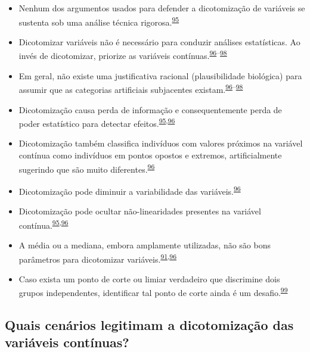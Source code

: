 \documentclass[
  a4paper,
]{book}
\begin{document}
\begin{itemize}
\item
  Nenhum dos argumentos usados para defender a dicotomização de variáveis se sustenta sob uma análise técnica rigorosa.\textsuperscript{\protect\hyperlink{ref-MacCallum2002}{95}}
\item
  Dicotomizar variáveis não é necessário para conduzir análises estatísticas. Ao invés de dicotomizar, priorize as variáveis contínuas.\textsuperscript{\protect\hyperlink{ref-Altman2006}{96}--\protect\hyperlink{ref-Collins2016}{98}}
\item
  Em geral, não existe uma justificativa racional (plausibilidade biológica) para assumir que as categorias artificiais subjacentes existam.\textsuperscript{\protect\hyperlink{ref-Altman2006}{96}--\protect\hyperlink{ref-Collins2016}{98}}
\item
  Dicotomização causa perda de informação e consequentemente perda de poder estatístico para detectar efeitos.\textsuperscript{\protect\hyperlink{ref-MacCallum2002}{95},\protect\hyperlink{ref-Altman2006}{96}}
\item
  Dicotomização também classifica indivíduos com valores próximos na variável contínua como indivíduos em pontos opostos e extremos, artificialmente sugerindo que são muito diferentes.\textsuperscript{\protect\hyperlink{ref-Altman2006}{96}}
\item
  Dicotomização pode diminuir a variabilidade das variáveis.\textsuperscript{\protect\hyperlink{ref-Altman2006}{96}}
\item
  Dicotomização pode ocultar não-linearidades presentes na variável contínua.\textsuperscript{\protect\hyperlink{ref-MacCallum2002}{95},\protect\hyperlink{ref-Altman2006}{96}}
\item
  A média ou a mediana, embora amplamente utilizadas, não são bons parâmetros para dicotomizar variáveis.\textsuperscript{\protect\hyperlink{ref-Fedorov2009}{91},\protect\hyperlink{ref-Altman2006}{96}}
\item
  Caso exista um ponto de corte ou limiar verdadeiro que discrimine dois grupos independentes, identificar tal ponto de corte ainda é um desafio.\textsuperscript{\protect\hyperlink{ref-Prince2017}{99}}
\end{itemize}

\hypertarget{quais-cenuxe1rios-legitimam-a-dicotomizauxe7uxe3o-das-variuxe1veis-contuxednuas}{%
\subsection{Quais cenários legitimam a dicotomização das variáveis contínuas?}\label{quais-cenuxe1rios-legitimam-a-dicotomizauxe7uxe3o-das-variuxe1veis-contuxednuas}}
\end{document}
